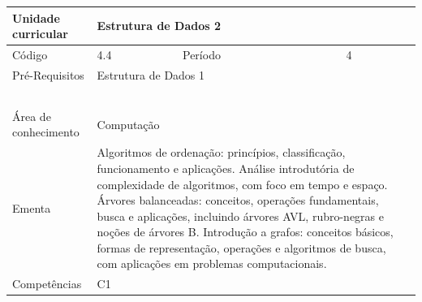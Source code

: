 \clearpage
\newpage

\begin{quadro}[ht!]
  \centering\scriptsize
\caption{Unidade Curricular Estrutura de Dados 2}

\begin{tabular}{|p{2.5cm}|p{2.5cm}|p{2.5cm}|p{2.5cm}|p{2.5cm}|}\hline

  Unidade curricular & \multicolumn{4}{p{10cm}|}{ Estrutura de Dados 2 }\\\hline
  Código & 4.4 & Período & \multicolumn{2}{p{5cm}|}{ 4 }\\\hline
  Pré-Requisitos & \multicolumn{4}{p{10cm}|}{ Estrutura de Dados 1 } \\\hline
  \cellcolor{blue1}{ CH PRESENCIAL } &
    \cellcolor{blue1}{CH EAD Síncrona} &
    \cellcolor{blue1}{CH EAD Síncrona Mediada} &
    \cellcolor{blue1}{CH EAD Assíncrona} &
    \cellcolor{blue1}{CH APCC} \\\hline
  \cellcolor{blue1}{ 60 } &
    \cellcolor{blue1}{ 0 } &
    \cellcolor{blue1}{ 0 } &
    \cellcolor{blue1}{ 0 } &
    \cellcolor{blue1}{0} \\\hline
  \cellcolor{blue1}{ CH Teórica } &
    \cellcolor{blue1}{CH Prática} &
    \cellcolor{blue1}{CH Humanidades} &
    \cellcolor{blue1}{CH Extensão} &
    \cellcolor{blue1}{CH EAD TOTAL} \\\hline
  \cellcolor{blue1}{ 30 } &
    \cellcolor{blue1}{ 30 } &
    \cellcolor{blue1}{ 0 } &
    \cellcolor{blue1}{ 0 } &
    \cellcolor{blue1}{ 0 } \\\hline
  \cellcolor{blue1}{CARGA-HORÁRIA TOTAL} & \multicolumn{4}{p{10cm}|}{ \cellcolor{blue1}{ 60 } } \\\hline
  Área de conhecimento & \multicolumn{4}{p{10cm}|}{ Computação } \\\hline
  Ementa & \multicolumn{4}{p{10cm}|}{ Algoritmos de ordenação: princípios, classificação, funcionamento e aplicações. Análise introdutória de complexidade de algoritmos, com foco em tempo e espaço. Árvores balanceadas: conceitos, operações fundamentais, busca e aplicações, incluindo árvores AVL, rubro-negras e noções de árvores B. Introdução a grafos: conceitos básicos, formas de representação, operações e algoritmos de busca, com aplicações em problemas computacionais. } \\\hline
  Competências & \multicolumn{4}{p{10cm}|}{ C1 } \\\hline


  
	\end{tabular}

\end{quadro}


